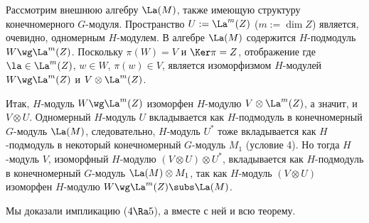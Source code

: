 \documentclass{article}
\begin{document}

Рассмотрим внешнюю алгебру $\La(M)$, также имеющую структуру конечномерного $G$-модуля. Пространство $U:=\La^m(Z)$
($m:=\dim Z$) является, очевидно, одномерным $H$-модулем. В алгебре $\La(M)$ содержится $H$-подмодуль
$W\wg\La^m(Z)$. Поскольку $\pi(W)=V$ и $\Ker\pi=Z$, отображение  где $\la\in\La^m(Z)$, $w\in W$, $\pi(w)\in V$, является
изоморфизмом $H$-модулей $W\wg\La^m(Z)$ и $V\otimes\La^m(Z)$.

Итак, $H$-модуль $W\wg\La^m(Z)$ изоморфен $H$-модулю $V\otimes\La^m(Z)$, а значит, и $V\otimes U$. Одномерный
$H$-модуль $U$ вкладывается как $H$-подмодуль в конечномерный $G$-модуль $\La(M)$, следовательно, $H$-модуль $U^*$
тоже вкладывается как $H$-подмодуль в некоторый конечномерный $G$-модуль $M_1$ (условие 4). Но тогда $H$-модуль
$V$, изоморфный $H$-модулю $(V\otimes U)\otimes U^*$, вкладывается как $H$-подмодуль в конечномерный $G$-модуль
$\La(M)\otimes M_1$, так как $H$-модуль $(V\otimes U)$ изоморфен $H$-модулю $W\wg\La^m(Z)\subs\La(M)$.

Мы доказали импликацию ($4\Ra5$), а вместе с ней и всю теорему.
\end{document}
